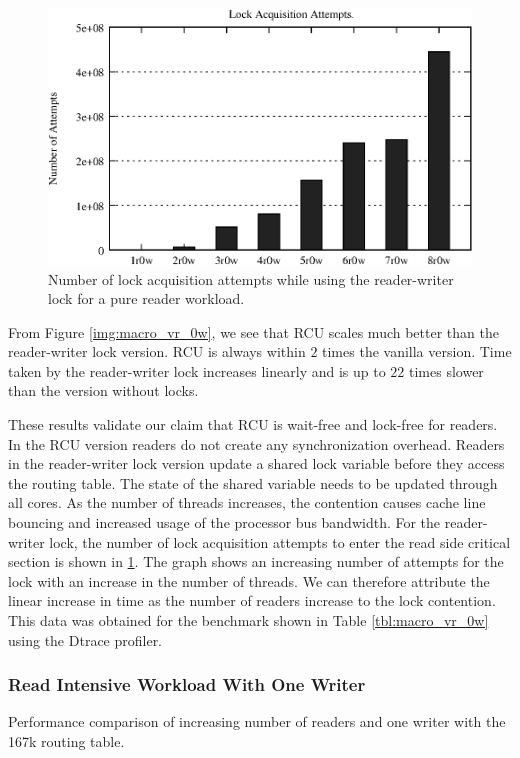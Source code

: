 \documentclass[a4paper,marginparwidth=50pt,marginparsep=10pt]{article}
\begin{document}
\begin{figure}[tph]
\includegraphics[scale = 0.7]{../images/graphs/profile_lockcount_macro_rwl_vr_0w}
\caption{Number of lock acquisition attempts while using the reader-writer lock for a pure reader workload.}
\label{img:profile_rwl_locks_vr_0w}
\end{figure}

From Figure \ref{img:macro_vr_0w}, we see that RCU scales much better
than the reader-writer lock version. RCU is always within $2$ times
the vanilla version. Time taken by the reader-writer lock increases
linearly and is up to $22$ times slower than the version without
locks.

These results validate our claim that RCU is wait-free and lock-free
for readers. In the RCU version readers do not create any
synchronization overhead. Readers in the reader-writer lock version
update a shared lock variable before they access the routing
table. The state of the shared variable needs to be updated through
all cores. As the number of threads increases, the contention causes
cache line bouncing and increased usage of the processor bus
bandwidth. For the reader-writer lock, the number of lock acquisition attempts to enter
the read side critical section is shown in \ref{img:profile_rwl_locks_vr_0w}. The graph shows an increasing number of attempts for the lock with an increase in the number of threads. We can therefore attribute the  linear increase in time as the number of readers increase to the lock contention. This data was obtained for the benchmark shown in Table \ref{tbl:macro_vr_0w} using the Dtrace profiler. 

\subsubsection{Read Intensive Workload With One Writer}
\begin{table}[tph]
\begin{center}

\end{center}
\caption{Performance comparison of increasing number of readers and one writer with the 167k routing table.}
\label{tbl:macro_vr_1w}
\end{table}
\end{document}
